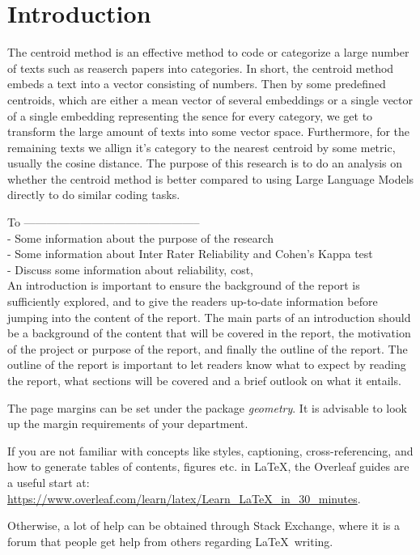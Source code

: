 \section{Introduction}
The centroid method is an effective method to code or categorize a large number of texts such as reaserch papers into categories. In short, the centroid method embeds a text into a vector consisting of numbers. Then by some predefined centroids, which are either a mean vector of several embeddings or a single vector of a single embedding representing the sence for every category, we get to transform the large amount of texts into some vector space. Furthermore, for the remaining texts we allign it's category to the nearest centroid by some metric, usually the cosine distance. The purpose of this research is to do an analysis on whether the centroid method is better compared to using Large Language Models directly to do similar coding tasks. 

To
----------------------------------------------- \\
- Some information about the purpose of the research\\
- Some information about Inter Rater Reliability and Cohen's Kappa test\\
- Discuss some information about reliability, cost,\\[30pt]

An introduction is important to ensure the background of the report is sufficiently explored, and to give the readers up-to-date information before jumping into the content of the report. The main parts of an introduction should be a background of the content that will be covered in the report, the motivation of the project or purpose of the report, and finally the outline of the report. The outline of the report is important to let readers know what to expect by reading the report, what sections will be covered and a brief outlook on what it entails.

The page margins can be set under the package \textit{geometry}. It is advisable to look up the margin requirements of your department. 

If you are not familiar with concepts like styles, captioning, cross-referencing, and how to generate tables of contents, figures etc. in LaTeX, the Overleaf guides are a useful start at: \url{https://www.overleaf.com/learn/latex/Learn_LaTeX_in_30_minutes}. 

Otherwise, a lot of help can be obtained through Stack Exchange, where it is a forum that people get help from others regarding \LaTeX\ writing. 

